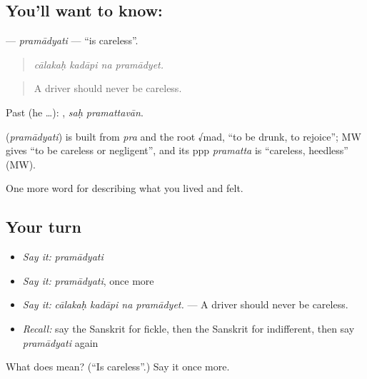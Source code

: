 \subsection*{You'll want to know: }
\textbf{} — \emph{pramādyati} — \textquotedblleft{}is careless\textquotedblright{}.

\begin{quote}
   
\end{quote}

\begin{quote}
\emph{cālakaḥ kadāpi na pramādyet.}
\end{quote}

\begin{quote}
A driver should never be careless.
\end{quote}

Past (he …):  , \emph{saḥ pramattavān}.

\begin{cousinweb}
\textbf{} (\emph{pramādyati}) is built from \emph{pra} and the root √mad, \textquotedblleft{}to be drunk, to rejoice\textquotedblright{}; MW gives \textquotedblleft{}to be careless or negligent\textquotedblright{}, and its ppp \emph{pramatta} is \textquotedblleft{}careless, heedless\textquotedblright{} (MW).
\end{cousinweb}

\begin{grammarlens}[title={What you've built}]
One more word for describing what you lived and felt.
\end{grammarlens}

\subsection*{Your turn}
\begin{itemize}
\raggedright
  \item \emph{Say it:} \emph{pramādyati}
  \item \emph{Say it:} \emph{pramādyati}, once more
  \item \emph{Say it:} \emph{cālakaḥ kadāpi na pramādyet.} — A driver should never be careless.
  \item \emph{Recall:} say the Sanskrit for fickle, then the Sanskrit for indifferent, then say \emph{pramādyati} again
\end{itemize}

\begin{tcolorbox}[breakable,colback=teal!4,colframe=teal!35!black,title={Before you move on}]
What does  mean? (\textquotedblleft{}Is careless\textquotedblright{}.) Say it once more.
\end{tcolorbox}
